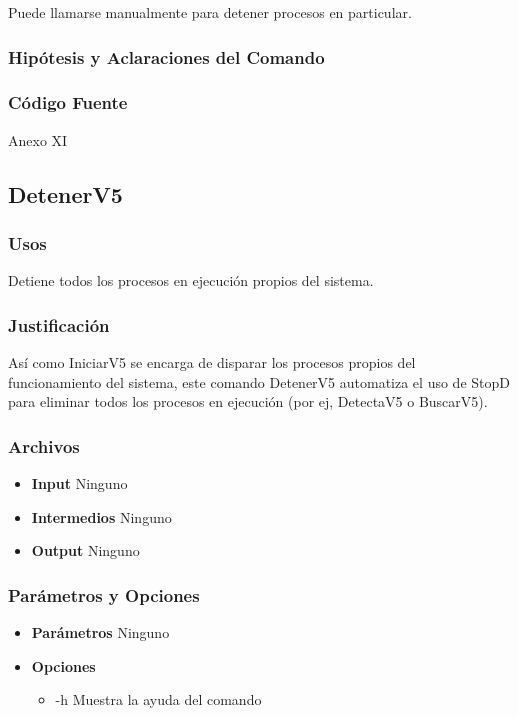 \documentclass[a4paper,10pt,titlepage]{article}
\begin{document}
			 Puede llamarse manualmente para detener procesos en particular.
		\subsubsection{Hip\'otesis y Aclaraciones del Comando}

		\subsubsection{C\'odigo Fuente}
			Anexo XI

	\subsection{DetenerV5}
		\subsubsection{Usos}
			Detiene todos los procesos en ejecuci\'on propios del sistema.
		\subsubsection{Justificaci\'on}
			As\'i como IniciarV5 se encarga de disparar los procesos propios del funcionamiento del sistema, este comando DetenerV5 automatiza el uso de StopD para eliminar todos los procesos en ejecuci\'on (por ej, DetectaV5 o BuscarV5). 

		\subsubsection{Archivos}
			\begin {itemize}
				\item \textbf{Input } {Ninguno}
				\item \textbf{Intermedios } {Ninguno}
				\item \textbf{Output } {Ninguno}
			\end{itemize}

		\subsubsection{Par\'ametros y Opciones}
			\begin {itemize}
				\item \textbf{Par\'ametros} { Ninguno }
				\item \textbf{Opciones}{
					\begin{itemize}
						\item {-h }{Muestra la ayuda del comando} 
					\end{itemize}
				}
			\end{itemize}
	
\end{document}
